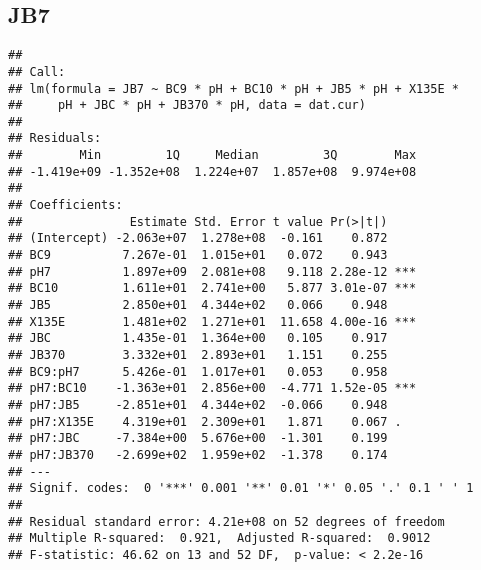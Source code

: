 \documentclass[
]{article}
\newenvironment{Shaded}{\begin{snugshade}}{\end{snugshade}}
\newcommand{\AttributeTok}[1]{\textcolor[rgb]{0.13,0.29,0.53}{#1}}
\newcommand{\DecValTok}[1]{\textcolor[rgb]{0.00,0.00,0.81}{#1}}
\newcommand{\FunctionTok}[1]{\textcolor[rgb]{0.13,0.29,0.53}{\textbf{#1}}}
\newcommand{\NormalTok}[1]{#1}
\newcommand{\OtherTok}[1]{\textcolor[rgb]{0.56,0.35,0.01}{#1}}
\newcommand{\SpecialCharTok}[1]{\textcolor[rgb]{0.81,0.36,0.00}{\textbf{#1}}}
\begin{document}
\hypertarget{jb7}{%
\subsection{JB7}\label{jb7}}

\begin{Shaded}
\end{Shaded}

\begin{verbatim}
## 
## Call:
## lm(formula = JB7 ~ BC9 * pH + BC10 * pH + JB5 * pH + X135E * 
##     pH + JBC * pH + JB370 * pH, data = dat.cur)
## 
## Residuals:
##        Min         1Q     Median         3Q        Max 
## -1.419e+09 -1.352e+08  1.224e+07  1.857e+08  9.974e+08 
## 
## Coefficients:
##               Estimate Std. Error t value Pr(>|t|)    
## (Intercept) -2.063e+07  1.278e+08  -0.161    0.872    
## BC9          7.267e-01  1.015e+01   0.072    0.943    
## pH7          1.897e+09  2.081e+08   9.118 2.28e-12 ***
## BC10         1.611e+01  2.741e+00   5.877 3.01e-07 ***
## JB5          2.850e+01  4.344e+02   0.066    0.948    
## X135E        1.481e+02  1.271e+01  11.658 4.00e-16 ***
## JBC          1.435e-01  1.364e+00   0.105    0.917    
## JB370        3.332e+01  2.893e+01   1.151    0.255    
## BC9:pH7      5.426e-01  1.017e+01   0.053    0.958    
## pH7:BC10    -1.363e+01  2.856e+00  -4.771 1.52e-05 ***
## pH7:JB5     -2.851e+01  4.344e+02  -0.066    0.948    
## pH7:X135E    4.319e+01  2.309e+01   1.871    0.067 .  
## pH7:JBC     -7.384e+00  5.676e+00  -1.301    0.199    
## pH7:JB370   -2.699e+02  1.959e+02  -1.378    0.174    
## ---
## Signif. codes:  0 '***' 0.001 '**' 0.01 '*' 0.05 '.' 0.1 ' ' 1
## 
## Residual standard error: 4.21e+08 on 52 degrees of freedom
## Multiple R-squared:  0.921,  Adjusted R-squared:  0.9012 
## F-statistic: 46.62 on 13 and 52 DF,  p-value: < 2.2e-16
\end{verbatim}
\end{document}
